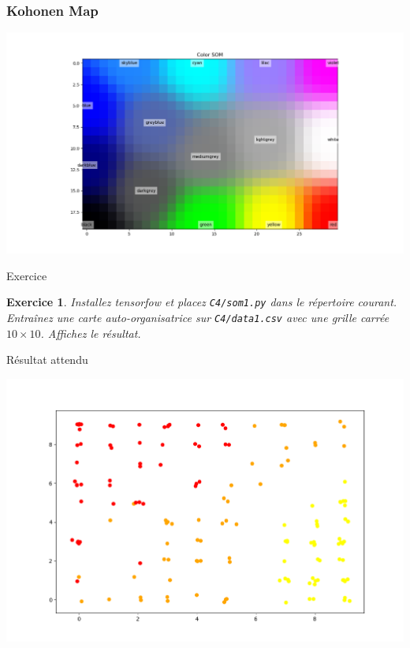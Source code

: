 \documentclass[11pt]{beamer}
\newenvironment{slide}[1]{%
\begin{frame}[environment=slide]
\frametitle{#1}
}{%
\end{frame}
}
\newtheorem{exercice}{Exercice}
\begin{document}
\begin{slide}{Kohonen Map}
\begin{center}
\includegraphics[scale=0.35]{som_exemple1}
\end{center}
\end{slide}


\begin{frame}{Exercice}

\begin{exercice}
Installez tensorfow et placez \texttt{C4/som1.py} dans le répertoire courant. Entraînez une carte auto-organisatrice sur \texttt{C4/data1.csv} avec une grille carrée $10 \times 10$. Affichez le résultat.
\end{exercice}
\end{frame}

\begin{frame}{Résultat attendu}
\begin{center}
\includegraphics[scale=0.4]{ex603}
\end{center}
\end{frame}
\end{document}
